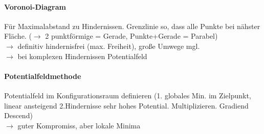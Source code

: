 \paragraph{Voronoi-Diagram}

Für Maximalabstand zu Hindernissen. Grenzlinie so, dass alle Punkte bei nähster Fläche. ($\to$ 2 punktförmige = Gerade, Punkte+Gerade = Parabel) \\
$\rightarrow$ definitiv hindernisfrei (max. Freiheit), große Umwege mgl.\\
$\to$ bei komplexen Hindernissen Potentialfeld

\paragraph{Potentialfeldmethode}

Potentialfeld im Konfigurationsraum definieren (1. globales Min. im Zielpunkt, linear ansteigend 2.Hindernisse sehr hohes Potential. Multiplizieren. Gradiend Descend) \\

$\rightarrow$ guter Kompromiss, aber lokale Minima

